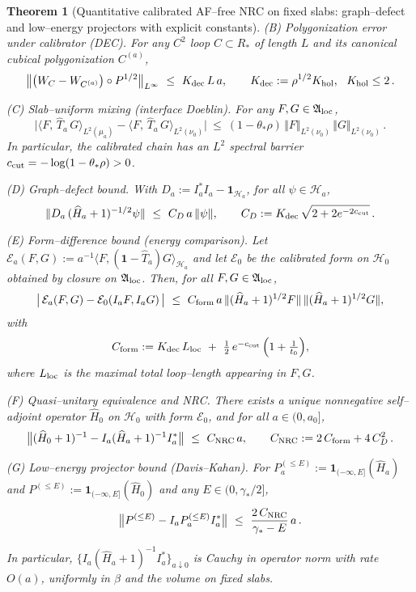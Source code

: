 \documentclass[11pt]{amsart}
\theoremstyle{plain}
\newtheorem{theorem}{Theorem}[section]
\theoremstyle{definition}
\theoremstyle{remark}
\renewcommand{\tfrac}[2]{\textstyle\frac{#1}{#2}}
\begin{document}
\begin{theorem}[Quantitative calibrated AF--free NRC on fixed slabs: graph--defect and low--energy projectors with explicit constants]
\emph{(B) Polygonization error under calibrator (DEC).} For any $C^2$ loop $C\subset R_*$ of length $L$ and its canonical cubical polygonization $C^{(a)}$,
\[
  \big\Vert \big(W_C - W_{C^{(a)}}\big)\circ P^{1/2}\big\Vert_{L^\infty}\ \le\ K_{\rm dec}\,L\,a,\qquad K_{\rm dec}:=\rho^{1/2} K_{\rm hol},\ \ K_{\rm hol}\le 2\,.
\]

\emph{(C) Slab--uniform mixing (interface Doeblin).} For any $F,G\in\mathfrak A_{\rm loc}$,
\[
  \big|\langle F,\,\widehat T_a\,G\rangle_{L^2(\mu_a)} - \langle F,\,\widehat T_a\,G\rangle_{L^2(\nu_0)}\big|\ \le\ (1-\theta_*\rho)\, \Vert F\Vert_{L^2(\nu_0)}\,\Vert G\Vert_{L^2(\nu_0)}\,.
\]
In particular, the calibrated chain has an $L^2$ spectral barrier $c_{\rm cut}=-\log(1-\theta_*\rho)>0$.

\emph{(D) Graph--defect bound.} With $D_a:=I_a^* I_a-\mathbf 1_{\mathcal H_a}$, for all $\psi\in\mathcal H_a$,
\[
  \Vert D_a\,(\widehat H_a+1)^{-1/2}\psi\Vert\ \le\ C_D\,a\,\Vert\psi\Vert,\qquad C_D:=K_{\rm dec}\,\sqrt{2+2 e^{-2 c_{\rm cut}}}\,.
\]

\emph{(E) Form--difference bound (energy comparison).} Let $\mathcal E_a(F,G):= a^{-1}\langle F,(\mathbf 1-\widehat T_a)G\rangle_{\mathcal H_a}$ and let $\mathcal E_0$ be the calibrated form on $\mathcal H_0$ obtained by closure on $\mathfrak A_{\rm loc}$. Then, for all $F,G\in\mathfrak A_{\rm loc}$,
\[
  \big|\,\mathcal E_a(F,G)-\mathcal E_0(I_a F, I_a G)\,\big|\ \le\ C_{\rm form}\,a\,\Vert(\widehat H_a+1)^{1/2}F\Vert\,\Vert(\widehat H_a+1)^{1/2}G\Vert,
\]
with
\[
  C_{\rm form}:= K_{\rm dec}\,L_{\rm loc}\ +\ \tfrac{1}{2}\,e^{-c_{\rm cut}}\,\Big(1+\tfrac{1}{t_0}\Big),
\]
where $L_{\rm loc}$ is the maximal total loop--length appearing in $F,G$.

\emph{(F) Quasi--unitary equivalence and NRC.} There exists a unique nonnegative self--adjoint operator $\widehat H_0$ on $\mathcal H_0$ with form $\mathcal E_0$, and for all $a\in(0,a_0]$,
\[
  \big\Vert (\widehat H_0+1)^{-1} - I_a(\widehat H_a+1)^{-1} I_a^* \big\Vert\ \le\ C_{\rm NRC}\,a,\qquad C_{\rm NRC}:=2\,C_{\rm form}+4\,C_D^2\,.
\]

\emph{(G) Low--energy projector bound (Davis--Kahan).} For $P_a^{(\le E)}:=\mathbf 1_{(-\infty,E]}(\widehat H_a)$ and $P^{(\le E)}:=\mathbf 1_{(-\infty,E]}(\widehat H_0)$ and any $E\in(0,\gamma_*/2]$,
\[
  \big\Vert P^{(\le E)} - I_a P_a^{(\le E)} I_a^* \big\Vert\ \le\ \frac{2\,C_{\rm NRC}}{\gamma_* - E}\,a\,.
\]

In particular, $\{I_a(\widehat H_a+1)^{-1} I_a^*\}_{a\downarrow 0}$ is Cauchy in operator norm with rate $O(a)$, uniformly in $\beta$ and the volume on fixed slabs.


\end{theorem}
\end{document}
